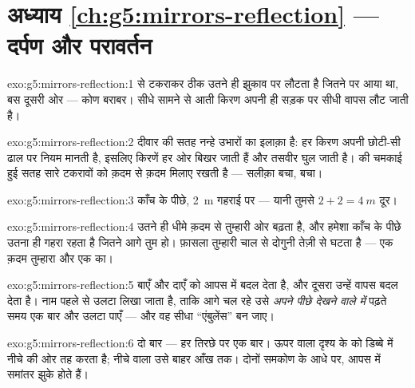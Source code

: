 \section*{अध्याय \ref{ch:g5:mirrors-reflection} --- दर्पण और परावर्तन}

\begin{solution}{exo:g5:mirrors-reflection:1}
  से टकराकर ठीक उतने ही झुकाव पर लौटता है जितने पर आया
था, बस दूसरी ओर --- कोण बराबर। सीधे सामने से आती किरण अपनी ही सड़क पर
सीधी वापस लौट जाती है।
\end{solution}

\begin{solution}{exo:g5:mirrors-reflection:2}
दीवार की सतह नन्हे उभारों का इलाक़ा है: हर किरण अपनी छोटी-सी ढाल पर
नियम मानती है, इसलिए किरणें हर ओर बिखर जाती हैं और तसवीर घुल जाती
है।  की चमकाई हुई सतह सारे टकरावों को क़दम से क़दम मिलाए रखती है
--- सलीक़ा बचा,  बचा।
\end{solution}

\begin{solution}{exo:g5:mirrors-reflection:3}
काँच के पीछे, \qty{2}{m} गहराई पर --- यानी तुमसे $2 + 2 =
\qty{4}{m}$ दूर।
\end{solution}

\begin{solution}{exo:g5:mirrors-reflection:4}
 उतने ही धीमे क़दम से तुम्हारी ओर बढ़ता है, और हमेशा काँच के
पीछे उतना ही गहरा रहता है जितने आगे तुम हो। फ़ासला तुम्हारी चाल से
दोगुनी तेज़ी से घटता है --- एक क़दम तुम्हारा और एक  का।
\end{solution}

\begin{solution}{exo:g5:mirrors-reflection:5}
 बाएँ और दाएँ को आपस में बदल देता है, और दूसरा  उन्हें
वापस बदल देता है। नाम पहले से उलटा लिखा जाता है, ताकि आगे चल रहे
 उसे \emph{अपने पीछे देखने वाले  में} पढ़ते समय एक बार और
उलटा पाएँ --- और वह सीधा ``एंबुलेंस'' बन जाए।
\end{solution}

\begin{solution}{exo:g5:mirrors-reflection:6}
दो बार --- हर तिरछे  पर एक बार। ऊपर वाला  दृश्य के 
को डिब्बे में नीचे की ओर तह करता है; नीचे वाला उसे बाहर आँख तक। दोनों
समकोण के आधे पर, आपस में समांतर झुके होते हैं।
\end{solution}

